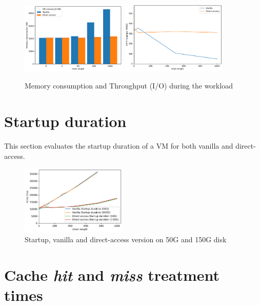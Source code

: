 \documentclass[sigplan,screen,10pt]{acmart}
\begin{document}
	\begin{figure}[h]
		\center
		\includegraphics[width=0.45\textwidth]{memory_consumption.pdf}
		\includegraphics[width=0.45\textwidth]{workload_dd_throughput.pdf}
		\caption{Memory consumption and Throughput (I/O) during the workload}
		\label{fig:fig3}
	\end{figure}
	
	\section*{Startup duration}
	This section evaluates the startup duration of a VM for both vanilla and direct-access.
	
	\begin{figure}[h]
		\center
		\includegraphics[width=0.45\textwidth]{startup_duration.pdf}
		\caption{Startup, vanilla and direct-access version on 50G and 150G disk}
		\label{fig:fig34}
	\end{figure}

	\section*{Cache \emph{hit} and \emph{miss} treatment times}
	
\end{document}
